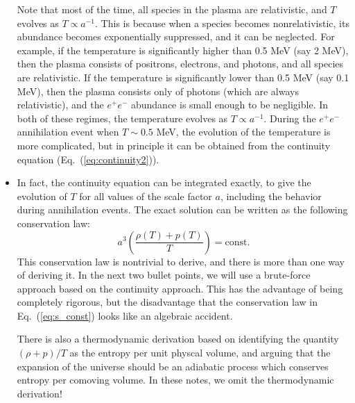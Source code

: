 \documentclass[aps,prd,superscriptaddress,groupedaddress,nofootinbib,nobibnotes]{revtex4}
\newcommand{\be}{\begin{equation}}
\newcommand{\ee}{\end{equation}}
\begin{document}
\begin{itemize}
Note that most of the time, all species in the plasma are relativistic, and $T$ evolves as $T \propto a^{-1}$.
This is because when a species becomes nonrelativistic, its abundance becomes exponentially suppressed, and it can be neglected.
For example, if the temperature is significantly higher than 0.5 MeV (say 2 MeV), then the plasma consists of positrons, electrons,
and photons, and all species are relativistic.
If the temperature is significantly lower than 0.5 MeV (say 0.1 MeV), then the plasma consists only of photons (which are always
relativistic), and the $e^+e^-$ abundance is small enough to be negligible.
In both of these regimes, the temperature evolves as $T \propto a^{-1}$.
During the $e^+e^-$ annihilation event when $T \sim 0.5$ MeV, the evolution of the temperature is more complicated,
but in principle it can be obtained from the continuity equation (Eq.~(\ref{eq:continuity2})).

\item
In fact, the continuity equation can be integrated exactly, to give the evolution of $T$ for all values of the
scale factor $a$, including the behavior during annihilation events.  The exact solution can be written as the
following conservation law:
\be
a^3 \left( \frac{\rho(T) + p(T)}{T} \right) = \mbox{const.}  \label{eq:s_const}
\ee
This conservation law is nontrivial to derive, and there is more than one way of deriving it.
In the next two bullet points, we will use a brute-force approach based on the continuity approach.
This has the advantage of being completely rigorous, but the disadvantage that the conservation law
in Eq.~(\ref{eq:s_const}) looks like an algebraic accident.

There is also a thermodynamic derivation based on identifying the quantity $(\rho+p)/T$ as the entropy
per unit physcal volume, and arguing that the expansion of the universe should be an adiabatic process
which conserves entropy per comoving volume.  In these notes, we omit the thermodynamic derivation!


\end{itemize}
\end{document}
